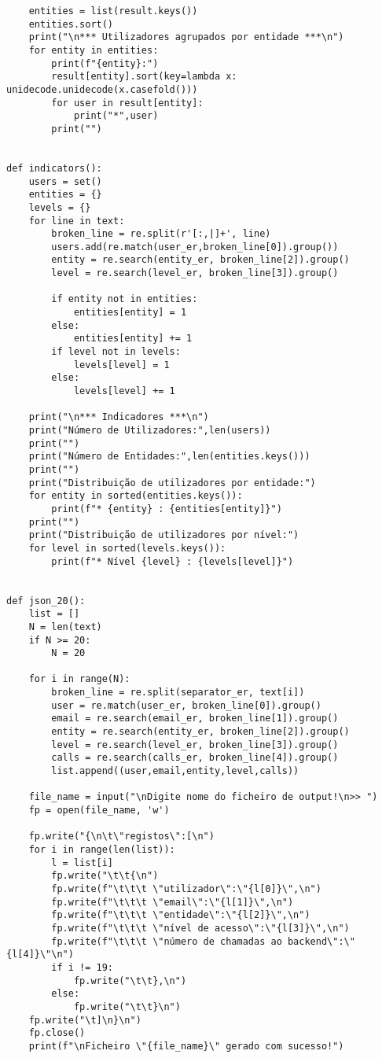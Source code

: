 \documentclass[11pt,a4paper]{report}%
\begin{document}
\begin{scriptsize}
\begin{verbatim}
    entities = list(result.keys())
    entities.sort()
    print("\n*** Utilizadores agrupados por entidade ***\n")
    for entity in entities:
        print(f"{entity}:")
        result[entity].sort(key=lambda x: unidecode.unidecode(x.casefold()))
        for user in result[entity]:
            print("*",user)
        print("")


def indicators():
    users = set()
    entities = {}
    levels = {}
    for line in text:
        broken_line = re.split(r'[:,|]+', line)
        users.add(re.match(user_er,broken_line[0]).group())
        entity = re.search(entity_er, broken_line[2]).group()
        level = re.search(level_er, broken_line[3]).group()

        if entity not in entities:
            entities[entity] = 1
        else:
            entities[entity] += 1
        if level not in levels:
            levels[level] = 1
        else:
            levels[level] += 1

    print("\n*** Indicadores ***\n")
    print("Número de Utilizadores:",len(users))
    print("")
    print("Número de Entidades:",len(entities.keys()))
    print("")
    print("Distribuição de utilizadores por entidade:")
    for entity in sorted(entities.keys()):
        print(f"* {entity} : {entities[entity]}")
    print("")
    print("Distribuição de utilizadores por nível:")
    for level in sorted(levels.keys()):
        print(f"* Nível {level} : {levels[level]}")


def json_20():
    list = []
    N = len(text)
    if N >= 20:
        N = 20

    for i in range(N):
        broken_line = re.split(separator_er, text[i])
        user = re.match(user_er, broken_line[0]).group()
        email = re.search(email_er, broken_line[1]).group()
        entity = re.search(entity_er, broken_line[2]).group()
        level = re.search(level_er, broken_line[3]).group()
        calls = re.search(calls_er, broken_line[4]).group()
        list.append((user,email,entity,level,calls))

    file_name = input("\nDigite nome do ficheiro de output!\n>> ")
    fp = open(file_name, 'w')

    fp.write("{\n\t\"registos\":[\n")
    for i in range(len(list)):
        l = list[i]
        fp.write("\t\t{\n")
        fp.write(f"\t\t\t \"utilizador\":\"{l[0]}\",\n")
        fp.write(f"\t\t\t \"email\":\"{l[1]}\",\n")
        fp.write(f"\t\t\t \"entidade\":\"{l[2]}\",\n")
        fp.write(f"\t\t\t \"nível de acesso\":\"{l[3]}\",\n")
        fp.write(f"\t\t\t \"número de chamadas ao backend\":\"{l[4]}\"\n")
        if i != 19:
            fp.write("\t\t},\n")
        else:
            fp.write("\t\t}\n")
    fp.write("\t]\n}\n")
    fp.close()
    print(f"\nFicheiro \"{file_name}\" gerado com sucesso!")



\end{verbatim}
\end{scriptsize}
\end{document}
